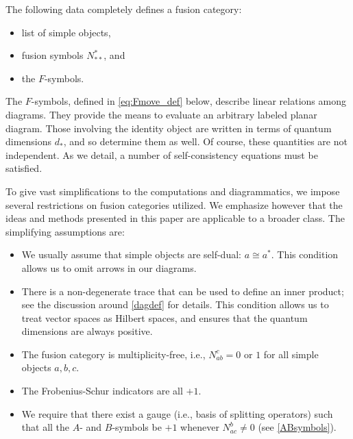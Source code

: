 The following data completely defines a fusion category:
\begin{itemize}
\setlength{\itemsep}{0ex}
\setlength{\parskip}{0.1ex}
\item	list of simple objects,
\item	fusion symbols $N^\ast_{\ast\ast}$,
and \item	the $F$-symbols.
\end{itemize}
The $F$-symbols, defined in \eqref{eq:Fmove_def} below, describe linear relations among diagrams. They provide the means to evaluate an arbitrary labeled planar diagram.
Those involving the identity object are written in terms of quantum dimensions $d_\ast$, and so determine them as well.
Of course,  these quantities are not independent. As we detail, a number of self-consistency equations must be satisfied.




To give vast simplifications to the computations and diagrammatics, we impose several restrictions on fusion categories utilized.  We emphasize however that the ideas and methods presented in this paper are applicable to a broader class. The simplifying assumptions are:
\begin{itemize}
\item	We usually assume that simple objects are self-dual: $a \cong a^\ast$.
This condition allows us to omit arrows in our diagrams.
\item There is a non-degenerate trace that can be used to define an inner product; see the discussion around \eqref{dagdef} for details. 
This condition allows us to treat vector spaces as Hilbert spaces, and ensures that the quantum dimensions are always positive.
\item	The fusion category is multiplicity-free, i.e., $N_{ab}^c = 0$ or $1$ for all simple objects $a,b,c$.
\item	The Frobenius-Schur indicators are all $+1$.
\item	We require that there exist a gauge (i.e., basis of splitting operators) such that all the $A$- and $B$-symbols be $+1$ whenever $N_{ac}^b \neq 0$ (see \eqref{ABsymbols}).
\end{itemize}



